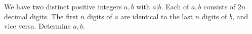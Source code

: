 We have two distinct positive integers $a,b$ with $a|b$. Each of $a,b$ consists of $2n$ decimal digits. The first $n$ digits of $a$ are identical to the last $n$ digits of $b$, and vice versa. Determine $a,b$.